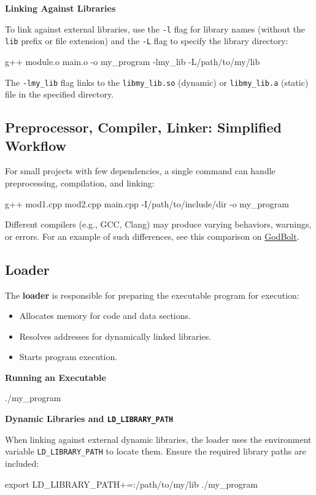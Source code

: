 \textbf{Linking Against Libraries}

To link against external libraries, use the \texttt{-l} flag for library names (without the \texttt{lib} prefix or file extension) and the \texttt{-L} flag to specify the library directory:

\begin{codeblock}[language=bash, numbers=none]
g++ module.o main.o -o my_program -lmy_lib -L/path/to/my/lib
\end{codeblock}

The \texttt{-lmy\_lib} flag links to the \texttt{libmy\_lib.so} (dynamic) or \texttt{libmy\_lib.a} (static) file in the specified directory.

\subsection{Preprocessor, Compiler, Linker: Simplified Workflow}

For small projects with few dependencies, a single command can handle preprocessing, compilation, and linking:

\begin{codeblock}[language=bash, numbers=none]
g++ mod1.cpp mod2.cpp main.cpp -I/path/to/include/dir -o my_program
\end{codeblock}

\begin{warningblock}
Different compilers (e.g., GCC, Clang) may produce varying behaviors, warnings, or errors. For an example of such differences, see this comparison on \href{https://godbolt.org/z/1M83E4sYE}{GodBolt}.
\end{warningblock}

\subsection{Loader}

The \textbf{loader} is responsible for preparing the executable program for execution:
\begin{itemize}
    \item Allocates memory for code and data sections.
    \item Resolves addresses for dynamically linked libraries.
    \item Starts program execution.
\end{itemize}

\textbf{Running an Executable}

\begin{codeblock}[language=bash, numbers=none]
./my_program
\end{codeblock}

\textbf{Dynamic Libraries and \texttt{LD\_LIBRARY\_PATH}}

When linking against external dynamic libraries, the loader uses the environment variable \texttt{LD\_LIBRARY\_PATH} to locate them. Ensure the required library paths are included:

\begin{codeblock}[language=bash, numbers=none]
export LD_LIBRARY_PATH+=:/path/to/my/lib
./my_program
\end{codeblock}
